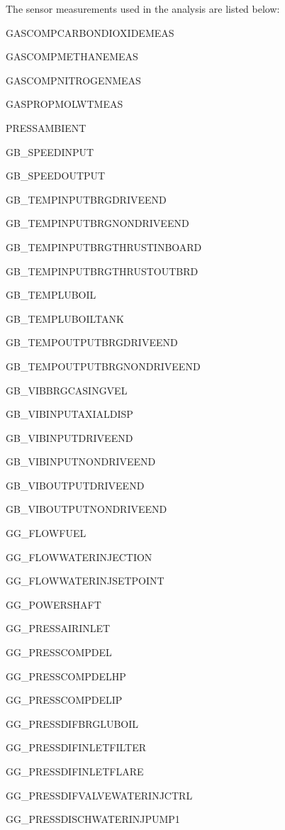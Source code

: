 \documentclass[runningheads]{llncs}
\begin{document}
The sensor measurements used in the analysis are listed below:

\begin{multicols}{3}
	\begin{enumerate}
		\scriptsize{
			\item GASCOMPCARBONDIOXIDEMEAS
			\item GASCOMPMETHANEMEAS
			\item GASCOMPNITROGENMEAS
			\item GASPROPMOLWTMEAS
			\item PRESSAMBIENT
			\item GB\_SPEEDINPUT
			\item GB\_SPEEDOUTPUT
			\item GB\_TEMPINPUTBRGDRIVEEND
			\item GB\_TEMPINPUTBRGNONDRIVEEND
			\item GB\_TEMPINPUTBRGTHRUSTINBOARD
			\item GB\_TEMPINPUTBRGTHRUSTOUTBRD
			\item GB\_TEMPLUBOIL
			\item GB\_TEMPLUBOILTANK
			\item GB\_TEMPOUTPUTBRGDRIVEEND
			\item GB\_TEMPOUTPUTBRGNONDRIVEEND
			\item GB\_VIBBRGCASINGVEL
			\item GB\_VIBINPUTAXIALDISP
			\item GB\_VIBINPUTDRIVEEND
			\item GB\_VIBINPUTNONDRIVEEND
			\item GB\_VIBOUTPUTDRIVEEND
			\item GB\_VIBOUTPUTNONDRIVEEND
			\item GG\_FLOWFUEL
			\item GG\_FLOWWATERINJECTION
			\item GG\_FLOWWATERINJSETPOINT
			\item GG\_POWERSHAFT
			\item GG\_PRESSAIRINLET
			\item GG\_PRESSCOMPDEL
			\item GG\_PRESSCOMPDELHP
			\item GG\_PRESSCOMPDELIP
			\item GG\_PRESSDIFBRGLUBOIL
			\item GG\_PRESSDIFINLETFILTER
			\item GG\_PRESSDIFINLETFLARE
			\item GG\_PRESSDIFVALVEWATERINJCTRL
			\item GG\_PRESSDISCHWATERINJPUMP1
}
\end{enumerate}
\end{multicols}
\end{document}
